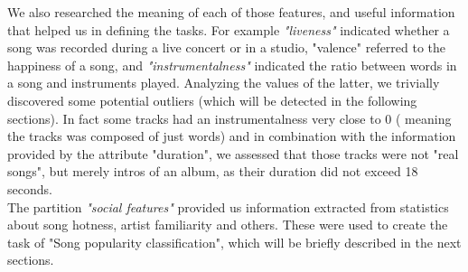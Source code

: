 We also researched the meaning of each of those features, and useful information that helped us in defining the tasks. For example \textit{"liveness"} indicated whether a song was recorded during a live concert or in a studio, "valence" referred to the happiness of a song, and \textit{"instrumentalness"} indicated the ratio between words in a song and instruments played. Analyzing the values of the latter, we trivially discovered some potential outliers (which will be detected in the following sections). In fact some tracks had an instrumentalness very close to 0 ( meaning the tracks was composed of just words) and in combination with the information provided by the attribute "duration", we assessed that those tracks were not "real songs", but merely intros of an album, as their duration did not exceed 18 seconds.\\
The partition \textit{"social features"} provided us information extracted from statistics about song hotness, artist familiarity and others. These were used to create the task of "Song popularity classification", which will be briefly described in the next sections. 
